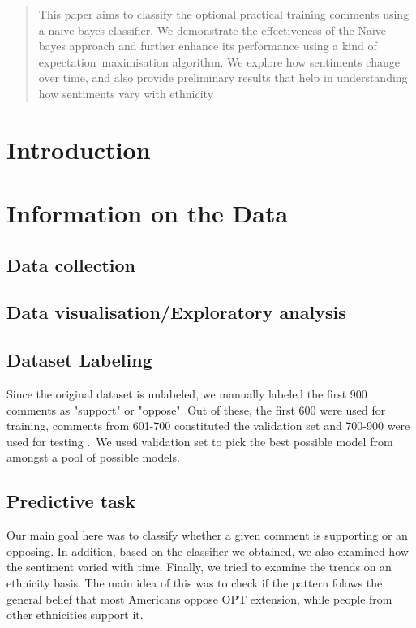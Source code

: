 \documentclass{sig-alternate-05-2015}
\begin{document}
\maketitle
\begin{abstract}
This paper aims to classify the optional practical training comments using a naive bayes classifier. We demonstrate the effectiveness of the Naive bayes approach and further enhance its performance using a kind of expectation\
maximisation algorithm. We explore how sentiments change over time, and also provide preliminary results that help in understanding how sentiments vary with ethnicity

\end{abstract}

\section{Introduction}

\section{Information on the Data}
\subsection{Data collection}

\subsection{Data visualisation/Exploratory analysis}

\subsection{Dataset Labeling}
Since the original dataset is unlabeled, we manually labeled the first 900 comments as "support" or "oppose". Out of these, the first 600 were used for training, comments from 601-700 constituted the validation set and 700-900 were used for testing .\ 
We used validation set to pick the best possible model from amongst a pool of possible models. 
\subsection{Predictive task}
Our main goal here was to classify whether a given comment is  supporting or an opposing. In addition, based on the classifier we obtained, we also examined how the sentiment varied with time. Finally, we tried to examine the trends on an ethnicity basis. The main idea of this was to check if the pattern folows the general belief that most Americans oppose OPT extension, while people from other ethnicities support it.
\end{document}
